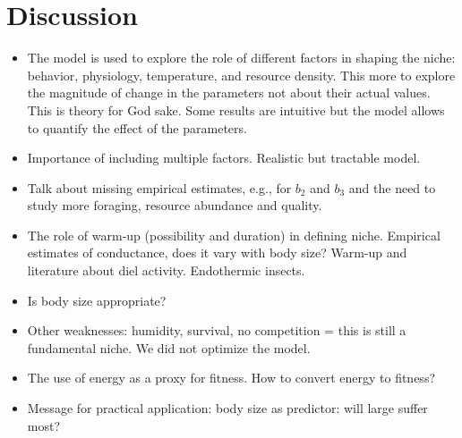 \section*{Discussion}
\begin{itemize}
\item The model is used to explore the role of different factors in shaping the niche: behavior, physiology, temperature, and resource density.
This more to explore the magnitude of change in the parameters not about their actual values. 
This is theory for God sake.
Some results are intuitive but the model allows to quantify the effect of the parameters.
\item Importance of including multiple factors. 
Realistic but tractable model.
\item Talk about missing empirical estimates, e.g., for $b_2$ and $b_3$ and the need to study more foraging, resource abundance and quality.
\item The role of warm-up (possibility and duration) in defining niche. 
Empirical estimates of conductance, does it vary with body size? 
Warm-up and literature about diel activity.  
Endothermic insects.
\item Is body size appropriate?
\item Other weaknesses: humidity, survival, no competition = this is still a fundamental niche. We did not optimize the model. 
\item The use of energy as a proxy for fitness. 
How to convert energy to fitness?
\item Message for practical application: body size as predictor: will large suffer most?
\end{itemize}
%
%
%
%
%
%
%
%
%
%
%
%
%


